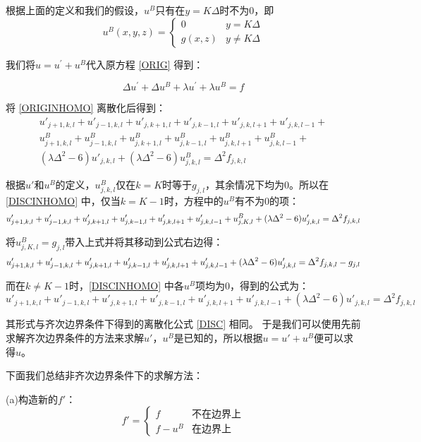 根据上面的定义和我们的假设，$u^{B}$只有在$y=K\Delta$时不为0，即
$$
u^{B}(x,y,z)=
\begin{cases}
0 &  y=K\Delta  \\
g(x,z) &  y\neq K\Delta
\end{cases}
$$  

我们将$u = u^{'} + u^{B}$代入原方程 \eqref{ORIG} 得到：

\begin{equation} \label{ORIGINHOMO}
\Delta u^{'} + \Delta u^{B} + \lambda u^{'} + \lambda u^{B} = f
\end{equation}  

将 \eqref{ORIGINHOMO} 离散化后得到：
\begin{equation} \label{DISCINHOMO}
\begin{split}
u'_{j+1,k,l}+u'_{j-1,k,l}+u'_{j,k+1,l}+u'_{j,k-1,l}+u'_{j,k,l+1}+u'_{j,k,l-1}+\\
u^{B}_{j+1,k,l}+u^{B}_{j-1,k,l}+u^{B}_{j,k+1,l}+u^{B}_{j,k-1,l}+u^{B}_{j,k,l+1}+u^{B}_{j,k,l-1}+\\
(\lambda \Delta^2 - 6)u'_{j,k,l} + (\lambda \Delta^2 - 6)u^{B}_{j,k,l} = \Delta^2 f_{j,k,l}
\end{split}
\end{equation}  

根据$u'$和$u^{B}$的定义，$u^{B}_{j,k,l}$仅在$k=K$时等于$g_{j,l}$，其余情况下均为0。所以在 \eqref{DISCINHOMO} 中，仅当$k=K-1$时，方程中的$u^{B}$有不为0的项：
$$
u'_{j+1,k,l}+u'_{j-1,k,l}+u'_{j,k+1,l}+u'_{j,k-1,l}+u'_{j,k,l+1}+u'_{j,k,l-1}+u^{B}_{j,K,l}+\\
(\lambda \Delta^2 - 6)u'_{j,k,l} = \Delta^2 f_{j,k,l}
$$

将$u^{B}_{j,K,l} = g_{j,l}$带入上式并将其移动到公式右边得：
$$
u'_{j+1,k,l}+u'_{j-1,k,l}+u'_{j,k+1,l}+u'_{j,k-1,l}+u'_{j,k,l+1}+u'_{j,k,l-1}+(\lambda \Delta^2 - 6)u'_{j,k,l} \\
= \Delta^2 f_{j,k,l} - g_{j,l}
$$

而在$k \neq K-1$时，\eqref{DISCINHOMO} 中各$u^{B}$项均为0，得到的公式为：
$$
u'_{j+1,k,l}+u'_{j-1,k,l}+u'_{j,k+1,l}+u'_{j,k-1,l}+u'_{j,k,l+1}+u'_{j,k,l-1}+(\lambda \Delta^2 - 6)u'_{j,k,l} = \Delta^2 f_{j,k,l}
$$  

其形式与齐次边界条件下得到的离散化公式 \eqref{DISC} 相同。
于是我们可以使用先前求解齐次边界条件的方法来求解$u'$，$u^{B}$是已知的，所以根据$u = u' + u^{B}$便可以求得$u$。  

下面我们总结非齐次边界条件下的求解方法：  

(a)构造新的$f'$：
$$
f'=
\begin{cases}
f &  \text{不在边界上} \\
f-u^{B} &  \text{在边界上}
\end{cases}
$$  

